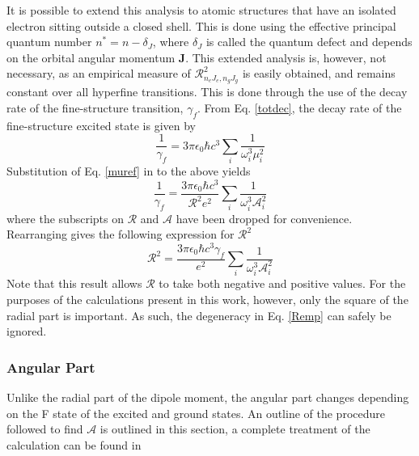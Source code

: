 It is possible to extend this analysis to atomic structures that have an isolated electron sitting outside a closed shell. This is done using the effective principal quantum number $n^*= n - \delta_{J}$, where $\delta_{J}$ is called the quantum defect and depends on the orbital angular momentum \textbf{J}. This extended analysis is, however, not necessary, as an empirical measure of $ \mathcal{R}^2_{n_e J_e, n_g J_g}$ is easily obtained, and remains constant over all hyperfine transitions. This is done through the use of the decay rate of the fine-structure transition, $\gamma_f$. From Eq. \ref{totdec}, the decay rate of the fine-structure excited state is given by
\begin{equation}
\frac{1}{\gamma_f} = 3 \pi \epsilon_0 \hbar c^3 \sum_i \frac{1}{\omega_i^3 \mu_i^2}
\end{equation}
Substitution of Eq. \ref{muref} in to the above yields
\begin{equation}
\frac{1}{\gamma_f} = \frac{3 \pi \epsilon_0 \hbar c^3}{\mathcal{R}^2e^2} \sum_i \frac{1}{\omega_i^3\mathcal{A}^2_i}
\end{equation}
where the subscripts on $\mathcal{R}$ and $\mathcal{A}$ have been dropped for convenience. Rearranging gives the following expression for $\mathcal{R}^2$
\begin{equation}
\mathcal{R}^2 = \frac{3 \pi \epsilon_0 \hbar c^3 \gamma_f}{e^2} \sum_i \frac{1}{\omega_i^3\mathcal{A}^2_i}
\label{Remp}
\end{equation}
Note that this result allows $\mathcal{R}$ to take both negative and positive values. For the purposes of the calculations present in this work, however, only the square of the radial part is important. As such, the degeneracy in Eq. \ref{Remp} can safely be ignored. 
\subsubsection*{Angular Part}
Unlike the radial part of the dipole moment, the angular part changes depending on the F state of the excited and ground states. An outline of the procedure followed to find $\mathcal{A}$ is outlined in this section, a complete treatment of the calculation can be found in \cite{LasCool} 

